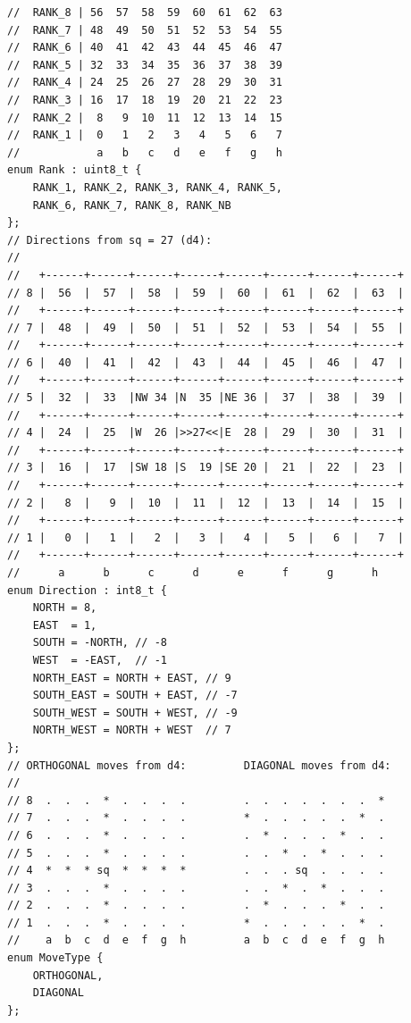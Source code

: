 \documentclass[12pt,a4paper,twoside,openright]{book}
\begin{document}
\begin{mdframed}[skipabove=\baselineskip,topline=false,rightline=false,bottomline=false,leftline=false,linewidth=1pt,linecolor=gray!40,innerleftmargin=8pt]
\begin{verbatim}
//  RANK_8 | 56  57  58  59  60  61  62  63
//  RANK_7 | 48  49  50  51  52  53  54  55
//  RANK_6 | 40  41  42  43  44  45  46  47
//  RANK_5 | 32  33  34  35  36  37  38  39
//  RANK_4 | 24  25  26  27  28  29  30  31
//  RANK_3 | 16  17  18  19  20  21  22  23
//  RANK_2 |  8   9  10  11  12  13  14  15
//  RANK_1 |  0   1   2   3   4   5   6   7
//            a   b   c   d   e   f   g   h
enum Rank : uint8_t {
    RANK_1, RANK_2, RANK_3, RANK_4, RANK_5, 
    RANK_6, RANK_7, RANK_8, RANK_NB
};
// Directions from sq = 27 (d4):
//
//   +------+------+------+------+------+------+------+------+
// 8 |  56  |  57  |  58  |  59  |  60  |  61  |  62  |  63  |
//   +------+------+------+------+------+------+------+------+
// 7 |  48  |  49  |  50  |  51  |  52  |  53  |  54  |  55  |
//   +------+------+------+------+------+------+------+------+
// 6 |  40  |  41  |  42  |  43  |  44  |  45  |  46  |  47  |
//   +------+------+------+------+------+------+------+------+
// 5 |  32  |  33  |NW 34 |N  35 |NE 36 |  37  |  38  |  39  |
//   +------+------+------+------+------+------+------+------+
// 4 |  24  |  25  |W  26 |>>27<<|E  28 |  29  |  30  |  31  |
//   +------+------+------+------+------+------+------+------+
// 3 |  16  |  17  |SW 18 |S  19 |SE 20 |  21  |  22  |  23  |
//   +------+------+------+------+------+------+------+------+
// 2 |   8  |   9  |  10  |  11  |  12  |  13  |  14  |  15  |
//   +------+------+------+------+------+------+------+------+
// 1 |   0  |   1  |   2  |   3  |   4  |   5  |   6  |   7  |
//   +------+------+------+------+------+------+------+------+
//      a      b      c      d      e      f      g      h
enum Direction : int8_t {
    NORTH = 8,
    EAST  = 1,
    SOUTH = -NORTH, // -8
    WEST  = -EAST,  // -1
    NORTH_EAST = NORTH + EAST, // 9
    SOUTH_EAST = SOUTH + EAST, // -7
    SOUTH_WEST = SOUTH + WEST, // -9
    NORTH_WEST = NORTH + WEST  // 7
};
// ORTHOGONAL moves from d4:         DIAGONAL moves from d4:
//
// 8  .  .  .  *  .  .  .  .         .  .  .  .  .  .  .  *
// 7  .  .  .  *  .  .  .  .         *  .  .  .  .  .  *  .
// 6  .  .  .  *  .  .  .  .         .  *  .  .  .  *  .  .
// 5  .  .  .  *  .  .  .  .         .  .  *  .  *  .  .  .
// 4  *  *  * sq  *  *  *  *         .  .  . sq  .  .  .  .
// 3  .  .  .  *  .  .  .  .         .  .  *  .  *  .  .  .
// 2  .  .  .  *  .  .  .  .         .  *  .  .  .  *  .  .
// 1  .  .  .  *  .  .  .  .         *  .  .  .  .  .  *  .
//    a  b  c  d  e  f  g  h         a  b  c  d  e  f  g  h
enum MoveType {
    ORTHOGONAL,
    DIAGONAL
};


\end{verbatim}
\end{mdframed}
\end{document}
